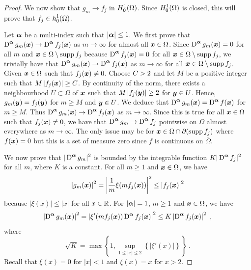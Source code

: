 \begin{proof}
We now show that $g_m \rightarrow f_j$ in $\displaystyle H^1_0(\Omega)$.
Since $\displaystyle H^1_0(\Omega)$ is closed, this will prove that
$\displaystyle f_j \in h^1_0(\Omega)$.

Let ${\bm{\alpha}}$ be a multi-index such that $|{\bm{\alpha}}|\leq 1$.
We first prove that $\displaystyle \operatorname{D}^{{\bm{\alpha}}} g_m({\bm{x}}) \rightarrow
\operatorname{D}^{{\bm{\alpha}}} f_j({\bm{x}})$ as $m\rightarrow \infty$ for almost all
${\bm{x}}\in \Omega$.
Since $\displaystyle \operatorname{D}^{{\bm{\alpha}}} g_m({\bm{x}})=0$ for all $m$ and
${\bm{x}} \in \Omega \setminus \operatorname{supp} f_j$ because
$\displaystyle \operatorname{D}^{{\bm{\alpha}}} f_j({\bm{x}})=0$ for all
${\bm{x}} \in \Omega \setminus \operatorname{supp} f_j$,
we trivially have that
$\displaystyle \operatorname{D}^{{\bm{\alpha}}} g_m({\bm{x}})
\rightarrow \operatorname{D}^{{\bm{\alpha}}} f_j({\bm{x}})$
as $m\rightarrow \infty$ for all ${\bm{x}} \in \Omega \setminus \operatorname{supp} f_j$.
Given ${\bm{x}} \in \Omega$ such that $f_j({\bm{x}}) \neq 0$.
Choose $\displaystyle C> 2$ and let $M$ be a positive integer such that
$\displaystyle M \left|f_j({\bm{x}})\right|\geq C$.  By continuity of the
norm, there exists a neighbourhood $U\subset \Omega$ of ${\bm{x}}$ such that 
$\displaystyle M \left|f_j({\bm{y}})\right|\geq 2$ for ${\bm{y}} \in U$.
Hence, $g_m({\bm{y}}) = f_j({\bm{y}})$ for $m\geq M$ and ${\bm{y}} \in U$.
We deduce that
$\displaystyle \operatorname{D}^{{\bm{\alpha}}} g_m({\bm{x}})
= \operatorname{D}^{{\bm{\alpha}}} f({\bm{x}})$
for $m\geq M$. 
Thus $\displaystyle \operatorname{D}^{{\bm{\alpha}}} g_m({\bm{x}}) \rightarrow
\operatorname{D}^{{\bm{\alpha}}} f_j({\bm{x}})$ as
$m\rightarrow \infty$.  Since this is true for all ${\bm{x}} \in \Omega$ such
that $f_j({\bm{x}}) \neq 0$, we have that
$\displaystyle \operatorname{D}^{{\bm{\alpha}}} g_m \rightarrow
\operatorname{D}^{{\bm{\alpha}}} f_j$ pointwise
on $\Omega$ almost everywhere as $m\rightarrow \infty$.  The only
issue may be for ${\bm{x}} \in \Omega \cap \partial (\operatorname{supp} f_j)$ where
$f({\bm{x}}) = 0$ but this is a set of measure zero since $f$ is
continuous on $\overline{\Omega}$.

We now prove that $\displaystyle |\operatorname{D}^{{\bm{\alpha}}} g_m|^2$ is bounded by
the integrable function $\displaystyle K |\operatorname{D}^{{\bm{\alpha}}} f_j|^2$ for all
$m$, where $K$ is a constant.  For all $m \geq 1$ and
${\bm{x}} \in \Omega$, we have
\[
\left| g_m({\bm{x}}) \right|^2 =
\left| \frac{1}{m} \xi(mf_j({\bm{x}})) \right|^2
\leq \left| f_j({\bm{x}}) \right|^2
\]
because $|\xi(x)|\leq |x|$ for all $x \in \mathbb{R}$.  For $|{\bm{\alpha}}|=1$,
$m \geq 1$ and ${\bm{x}}\in \Omega$, we have
\[
\left| \operatorname{D}^{{\bm{\alpha}}} g_m({\bm{x}}) \right|^2 =
\left| \xi'(mf_j({\bm{x}})) \operatorname{D}^{{\bm{\alpha}}} f_j({\bm{x}}) \right|^2
\leq K \left| \operatorname{D}^{{\bm{\alpha}}} f_j({\bm{x}}) \right|^2 \ ,
\]
where
\[
\sqrt{K} = \max \left\{ 1,
\sup_{1\leq |x|\leq 2} \left\{ |\xi'(x)| \right\} \right\} \ .
\]
Recall that $\xi(x) =0$ for $|x|<1$ and $\xi(x) = x$ for $x>2$.


\end{proof}
